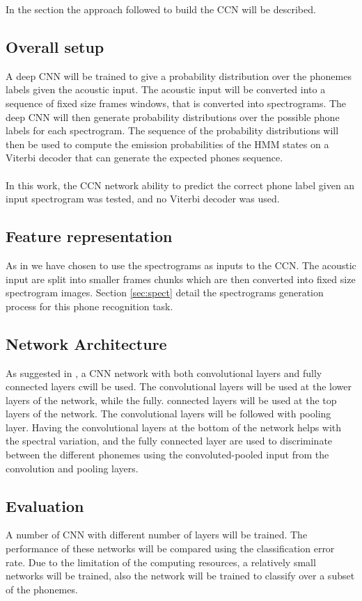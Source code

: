 In the section the approach followed to build the CCN will be described.
\subsection{Overall setup}
A deep CNN will be trained to give a probability distribution over the phonemes labels given the acoustic input. The acoustic input will be converted into a sequence of fixed size frames windows, that is converted into spectrograms. The deep CNN will then generate probability distributions over the possible phone labels for each spectrogram. The sequence of the probability distributions will then be used to compute the emission probabilities of the HMM states on a Viterbi decoder that can generate the expected phones sequence.\\\\
In this work, the CCN network ability to predict the correct phone label given an input spectrogram was tested, and no Viterbi decoder was used.
\subsection{Feature representation}
As in \cite{graves2014towards} we have chosen to use the spectrograms as inputs to the CCN. The acoustic input are split into smaller frames chunks which are then converted into fixed size spectrogram images. Section \ref{sec:spect} detail the spectrograms generation process for this phone recognition task.

\subsection{Network Architecture}
As suggested in \cite{sainath2013deep}, a CNN network with both convolutional layers and fully connected layers cwill be used. The convolutional layers will be used at the lower layers of the network, while the fully. connected layers will be used at the top layers of the network. The convolutional layers will be followed with pooling layer. Having the convolutional layers at the bottom of the network helps with the spectral variation, and the fully connected layer are used to discriminate between the different phonemes using the convoluted-pooled input from the convolution and pooling layers.
\subsection{Evaluation}
A number of CNN with different number of layers will be trained. The performance of these networks will be compared using the classification error rate. Due to the limitation of the computing resources, a relatively small networks will be trained, also the network will be trained to classify over a subset of the phonemes.